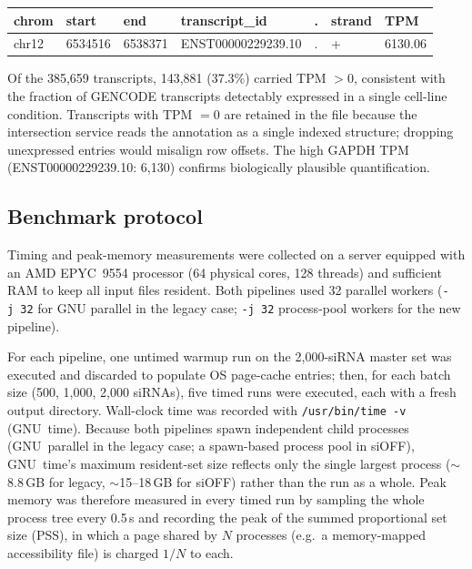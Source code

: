 \documentclass[11pt]{article}
\begin{document}
\begin{center}
\small
\begin{tabular}{lllllll}
\toprule
chrom & start & end & transcript\_id & . & strand & TPM \\
\midrule
chr12 & 6534516 & 6538371 & ENST00000229239.10 & . & + & 6130.06 \\
\bottomrule
\end{tabular}
\end{center}

Of the 385{,}659 transcripts, 143{,}881 (37.3\%) carried TPM $> 0$, consistent with the fraction of GENCODE transcripts detectably expressed in a single cell-line condition.
Transcripts with TPM $= 0$ are retained in the file because the intersection service reads the annotation as a single indexed structure; dropping unexpressed entries would misalign row offsets.
The high GAPDH TPM (ENST00000229239.10: 6{,}130) confirms biologically plausible quantification.

\subsection{Benchmark protocol}\label{sec:benchmark-protocol}

Timing and peak-memory measurements were collected on a server equipped with an AMD EPYC~9554 processor (64 physical cores, 128 threads) and sufficient RAM to keep all input files resident.
Both pipelines used 32 parallel workers (\texttt{-j~32} for GNU parallel in the legacy case; \texttt{-j~32} process-pool workers for the new pipeline).

For each pipeline, one untimed warmup run on the 2{,}000-siRNA master set was executed and discarded to populate OS page-cache entries; then, for each batch size (500, 1{,}000, 2{,}000 siRNAs), five timed runs were executed, each with a fresh output directory.
Wall-clock time was recorded with \texttt{/usr/bin/time -v} (GNU~time).
Because both pipelines spawn independent child processes (GNU~parallel in the legacy case; a spawn-based process pool in siOFF), GNU~time's maximum resident-set size reflects only the single largest process ($\sim$8.8\,GB for legacy, $\sim$15--18\,GB for siOFF) rather than the run as a whole.
Peak memory was therefore measured in every timed run by sampling the whole process tree every 0.5\,s and recording the peak of the summed proportional set size (PSS), in which a page shared by $N$ processes (e.g.\ a memory-mapped accessibility file) is charged $1/N$ to each.
\end{document}
